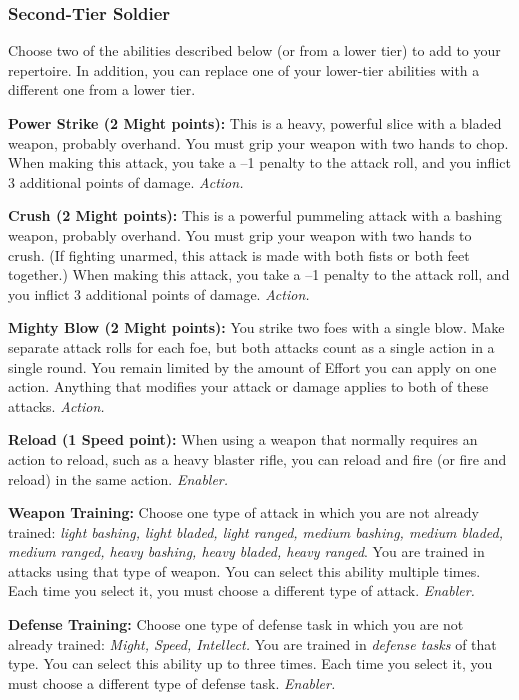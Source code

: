 \documentclass[a4paper,10pt,final,twocolumn,oneside]{book}
\newcommand{\itemAbility}[2]{\textcolor{25gray}{\textbullet\textbf{ #1:}}{ #2}\par}
\newcommand{\enabler}{\textit{ Enabler.}}
\newcommand{\action}{\textit{ Action.}}
\begin{document}
\subsubsection*{Second-Tier Soldier}
\label{subsub:soldierSecondTier}

Choose two of the abilities described below (or from a lower tier) to add to your repertoire. In addition, you can replace one of your lower-tier abilities with a different one from a lower tier.

\itemAbility{Power Strike (2 Might points)}{This is a heavy, powerful slice with a bladed weapon, probably overhand. You must grip your weapon with two hands to chop. When making this attack, you take a –1 penalty to the attack roll, and you inflict 3 additional points of damage.\action}

\itemAbility{Crush (2 Might points)}{This is a powerful pummeling attack with a bashing weapon, probably overhand. You must grip your weapon with two hands to crush. (If fighting unarmed, this attack is made with both fists or both feet together.) When making this attack, you take a –1 penalty to the attack roll, and you inflict 3 additional points of damage.\action}

\itemAbility{Mighty Blow (2 Might points)}{You strike two foes with a single blow. Make separate attack rolls for each foe, but both attacks count as a single action in a single round. You remain limited by the amount of Effort you can apply on one action. Anything that modifies your attack or damage applies to both of these attacks.\action}

\itemAbility{Reload (1 Speed point)}{When using a weapon that normally requires an action to reload, such as a heavy blaster rifle, you can reload and fire (or fire and reload) in the same action.\enabler}

\itemAbility{Weapon Training}{Choose one type of attack in which you are not already trained: \textit{light bashing, light bladed, light ranged, medium bashing, medium bladed, medium ranged, heavy bashing, heavy bladed, heavy ranged}. You are trained in attacks using that type of weapon. You can select this ability multiple times. Each time you select it, you must choose a different type of attack.\enabler}

\itemAbility{Defense Training}{Choose one type of defense task in which you are not already trained: \textit{Might, Speed, Intellect.} You are trained in \emph{defense tasks} of that type. You can select this ability up to three times. Each time you select it, you must choose a different type of defense task.\enabler}
\end{document}
